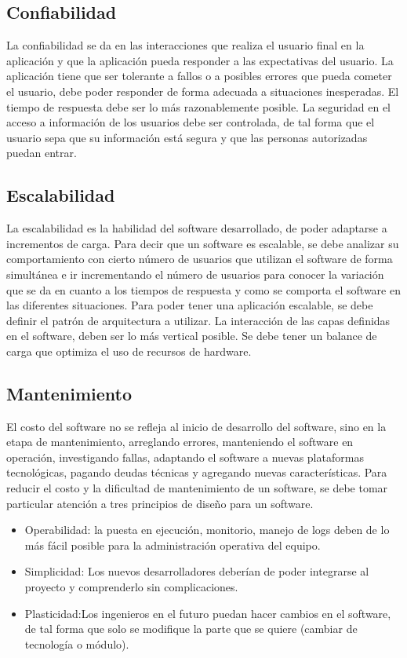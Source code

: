 \subsection{Confiabilidad}
\noindent La confiabilidad se da en las interacciones que realiza el usuario final en la aplicación y que la aplicación pueda responder a las expectativas del usuario. La aplicación tiene que ser tolerante a fallos o a posibles errores que pueda cometer el usuario, debe poder responder de forma adecuada a situaciones inesperadas. El tiempo de respuesta debe ser lo más razonablemente posible. La seguridad en el acceso a información de los usuarios debe ser controlada, de tal forma que el usuario sepa que su información está segura y que las personas autorizadas puedan entrar.


\subsection{Escalabilidad}
\noindent La escalabilidad es la habilidad del software desarrollado, de poder adaptarse a incrementos de carga. Para decir que un software es escalable, se debe analizar su comportamiento con cierto número de usuarios que utilizan el software de forma simultánea e ir incrementando el número de usuarios para conocer la variación que se da en cuanto a los tiempos de respuesta y como se comporta el software en las diferentes situaciones.
\noindent Para poder tener una aplicación escalable, se debe definir el patrón de arquitectura a utilizar. La interacción de las capas definidas en el software, deben ser lo más vertical posible. Se debe tener un balance de carga que optimiza el uso de recursos de hardware. 

\subsection{Mantenimiento}
\noindent El costo del software no se refleja al inicio de desarrollo del software, sino en la etapa de mantenimiento, arreglando errores, manteniendo el software en operación, investigando fallas, adaptando el software a nuevas plataformas tecnológicas, pagando deudas técnicas y agregando nuevas características.
Para reducir el costo y la dificultad de mantenimiento de un software, se debe tomar particular atención a tres principios de diseño para un software.
\begin{itemize}
\item Operabilidad: la puesta en ejecución, monitorio, manejo de logs deben de lo más fácil posible para la administración operativa del equipo.
\item Simplicidad: Los nuevos desarrolladores deberían de poder integrarse al proyecto y comprenderlo sin complicaciones.
\item Plasticidad:Los ingenieros en el futuro puedan hacer cambios en el software, de tal forma que solo se modifique la parte que se quiere (cambiar de tecnología o módulo).
\end{itemize}

